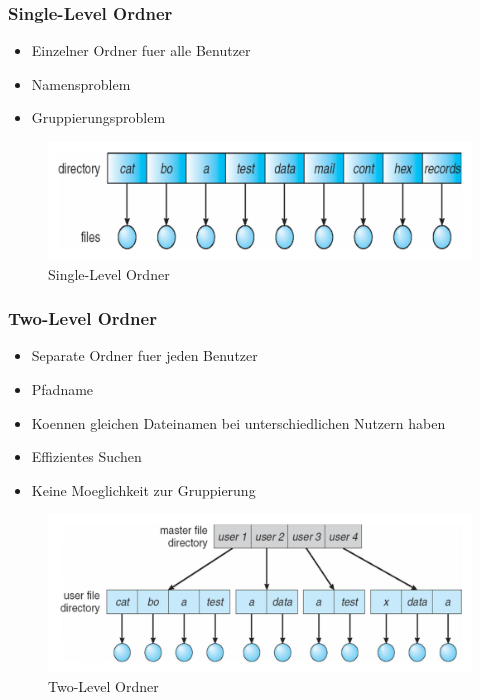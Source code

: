 \documentclass[a4paper]{scrreprt}
\begin{document}
\subsubsection{Single-Level Ordner}
\begin{itemize}
	\item Einzelner Ordner fuer alle Benutzer
	\item Namensproblem
	\item Gruppierungsproblem
\end{itemize}

\begin{figure}[ht]
\centering
\includegraphics[scale=0.2]{graphics/single_level_directory.png}
\caption{Single-Level Ordner}
\end{figure}

\subsubsection{Two-Level Ordner}
\begin{itemize}
	\item Separate Ordner fuer jeden Benutzer
	\item Pfadname
	\item Koennen gleichen Dateinamen bei unterschiedlichen Nutzern haben
	\item Effizientes Suchen
	\item Keine Moeglichkeit zur Gruppierung
\end{itemize}

\begin{figure}[ht]
\centering
\includegraphics[scale=0.2]{graphics/two_level_directory.png}
\caption{Two-Level Ordner}
\end{figure}
\end{document}
